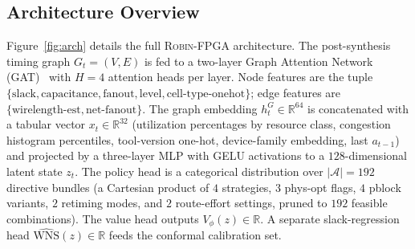 \documentclass[journal]{IEEEtran}
\begin{document}
\subsection{Architecture Overview}
Figure~\ref{fig:arch} details the full \textsc{Robin-FPGA} architecture. The post-synthesis timing graph $G_t = (V, E)$ is fed to a two-layer Graph Attention Network (GAT)~\cite{velickovic2018gat} with $H=4$ attention heads per layer. Node features are the tuple $\{\text{slack},\text{capacitance},\text{fanout},\text{level},\text{cell-type-onehot}\}$; edge features are $\{\text{wirelength-est},\text{net-fanout}\}$. The graph embedding $h^{G}_t \in \mathbb{R}^{64}$ is concatenated with a tabular vector $x_t \in \mathbb{R}^{32}$ (utilization percentages by resource class, congestion histogram percentiles, tool-version one-hot, device-family embedding, last $a_{t-1}$) and projected by a three-layer MLP with GELU activations to a $128$-dimensional latent state $z_t$. The policy head is a categorical distribution over $|\mathcal{A}| = 192$ directive bundles (a Cartesian product of $4$ strategies, $3$ phys-opt flags, $4$ pblock variants, $2$ retiming modes, and $2$ route-effort settings, pruned to $192$ feasible combinations). The value head outputs $V_\phi(z) \in \mathbb{R}$. A separate slack-regression head $\widehat{\mathrm{WNS}}(z) \in \mathbb{R}$ feeds the conformal calibration set.
\end{document}

